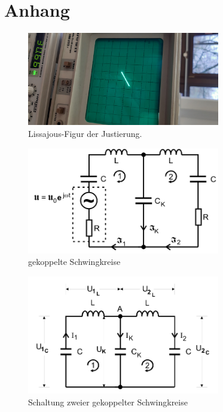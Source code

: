 \pagebreak
\section{Anhang}
\label{sec:anhang}

\begin{figure}
    \centering
    \includegraphics[width=0.75\textwidth, angle=-90]{plots/Lissajour-Gerade.jpeg}
    \caption{Lissajous-Figur der Justierung.}
    \label{fig:Lissajous}
\end{figure}

\begin{figure}
    \centering
    \includegraphics[width=0.75\textwidth]{plots/Schaltung3.png}
    \caption{gekoppelte Schwingkreise \cite{Versuchsanleitung}}
    \label{fig:schaltung3}
\end{figure}


\begin{figure}
    \centering
    \includegraphics[width=0.75\textwidth]{plots/Schaltung2.png}
    \caption{Schaltung zweier gekoppelter Schwingkreise \cite{Versuchsanleitung}}
    \label{fig:schaltung2}
\end{figure}


